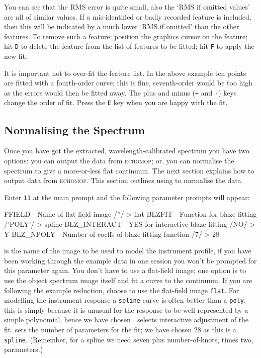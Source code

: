 \documentclass[twoside,11pt]{starlink}
\providecommand{\scspec}[2]{#1}
\begin{document}
You can see that the RMS error is quite small, also the `RMS if omitted
values' are all of similar values.  If a mis-identified or badly recorded
feature is included, then this will be indicated by a much lower
`RMS if omitted' than the other features.  To remove such a feature:
position the graphics cursor on the feature; hit \verb+D+ to delete the
feature from the list of features to be fitted; hit \verb+F+ to apply the
new fit.

It is important not to over-fit the feature list.  In the above example
ten points are fitted with a fourth-order curve; this is fine,
seventh-order would be too high as the errors would then be fitted away.
The plus and minus (\verb=+= and \verb=-=) keys change the order of fit.
Press the \verb+E+ key when you are happy with the fit.


\subsection{Normalising the Spectrum}

Once you have got the extracted, wavelength-calibrated spectrum you have
two options: you can output the data from \textsc{echomop}; or, you can normalise
the spectrum to give a more-or-less flat continuum.  The next section
explains how to output data from \textsc{echomop}.  This section outlines using
 to normalise
the data.

Enter \verb+11+ at the main  prompt
and the following parameter prompts will appear:

{
\scspec{\small}{ }
\begin{terminalv}
    FFIELD - Name of flat-field image /''/ > flat
    BLZFIT - Function for blaze fitting /'POLY'/ > spline
    BLZ_INTERACT - YES for interactive blaze-fitting /NO/ > Y
    BLZ_NPOLY - Number of coeffs of blaze fitting function /7/ > 28
\end{terminalv}
}

 is the name of the image to be
used to model the instrument profile, if you have been working through the
example data in one session you won't be prompted for this parameter
again.
You don't have to use a flat-field image; one option is to use
the object spectrum image itself and fit a curve to the continuum.
If you are following the example reduction, choose to use the flat-field
image \verb+flat+\@.
For modelling the instrument response a \verb+spline+ curve is often
better than a \verb+poly+, this is simply because it is unusual
for the response to be well represented by a simple polynomial, hence we
have chosen \@.
 selects
interactive adjustment of the fit.
 sets the number of
parameters for the fit; we have chosen 28 as this is a \verb+spline+\@.
(Remember, for a spline we need seven plus number-of-knots, times two,
parameters.)
\end{document}
